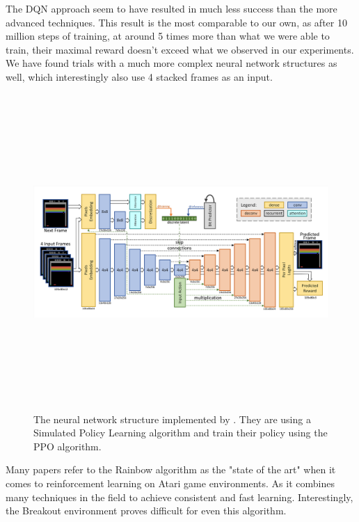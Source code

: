 \documentclass{article}
\begin{document}
The DQN approach seem to have resulted in much less success than the more advanced techniques. This result is the most comparable to our own, as after 10 million steps of training, at around 5 times more than what we were able to train, their maximal reward doesn't exceed what we observed in our experiments.
\newline\newline
We have found trials with a much more complex neural network structures as well, which interestingly also use 4 stacked frames as an input.
\begin{figure}[H]
    \centering
\includegraphics[width=12cm,height=12cm,keepaspectratio]{img/EmbeddedImage.png}
\caption{The neural network structure implemented by \cite{largenet}. They are using a Simulated Policy Learning algorithm and train their policy using the PPO algorithm.}
\end{figure}
Many papers refer to the Rainbow algorithm \cite{rainbow} as the "state of the art" when it comes to reinforcement learning on Atari game environments. As it combines many techniques in the field to achieve consistent and fast learning. Interestingly, the Breakout environment proves difficult for even this algorithm.
\end{document}
